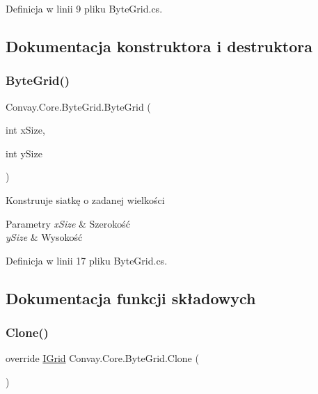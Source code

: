 Definicja w linii 9 pliku Byte\+Grid.\+cs.



\subsection{Dokumentacja konstruktora i destruktora}
\hypertarget{class_convay_1_1_core_1_1_byte_grid_a93744df4805647b20c435659ba40a6a5}{}\label{class_convay_1_1_core_1_1_byte_grid_a93744df4805647b20c435659ba40a6a5} 
\subsubsection{\texorpdfstring{Byte\+Grid()}{ByteGrid()}}
{\footnotesize\ttfamily Convay.\+Core.\+Byte\+Grid.\+Byte\+Grid (\begin{DoxyParamCaption}\item[{int}]{x\+Size,  }\item[{int}]{y\+Size }\end{DoxyParamCaption})}



Konstruuje siatkę o zadanej wielkości 


\begin{DoxyParams}{Parametry}
{\em x\+Size} & Szerokość\\
\hline
{\em y\+Size} & Wysokość\\
\hline
\end{DoxyParams}


Definicja w linii 17 pliku Byte\+Grid.\+cs.



\subsection{Dokumentacja funkcji składowych}
\hypertarget{class_convay_1_1_core_1_1_byte_grid_aff3101705112bb6f708d694b34a7e5f2}{}\label{class_convay_1_1_core_1_1_byte_grid_aff3101705112bb6f708d694b34a7e5f2} 
\subsubsection{\texorpdfstring{Clone()}{Clone()}}
{\footnotesize\ttfamily override \hyperlink{interface_convay_1_1_core_1_1_interfaces_1_1_i_grid}{I\+Grid} Convay.\+Core.\+Byte\+Grid.\+Clone (\begin{DoxyParamCaption}{ }\end{DoxyParamCaption})\hspace{0.3cm}{\ttfamily [virtual]}}



